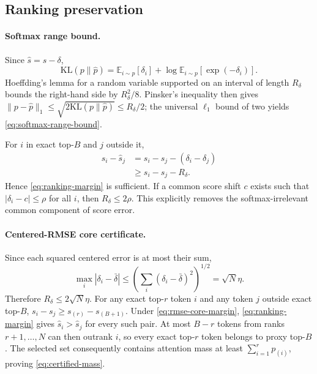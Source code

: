 \subsection{Ranking preservation}

\paragraph{Softmax range bound.}
Since $\widehat s=s-\delta$,
\begin{equation}
 \mathrm{KL}(p\|\widehat p)
 =\mathbb E_{i\sim p}[\delta_i]
  +\log\mathbb E_{i\sim p}[\exp(-\delta_i)].
\end{equation}
Hoeffding's lemma for a random variable supported on an interval of length
$R_\delta$ bounds the right-hand side by $R_\delta^2/8$.
Pinsker's inequality then gives
$\|p-\widehat p\|_1\le\sqrt{2\mathrm{KL}(p\|\widehat p)}
\le R_\delta/2$; the universal $\ell_1$ bound of two yields
\cref{eq:softmax-range-bound}.

For $i$ in exact top-$B$ and $j$ outside it,
\begin{align}
 \widehat s_i-\widehat s_j
 &=s_i-s_j-(\delta_i-\delta_j)\\
 &\ge s_i-s_j-R_\delta.
\end{align}
Hence \cref{eq:ranking-margin} is sufficient.
If a common score shift $c$ exists such that
$|\delta_i-c|\le\rho$ for all $i$, then $R_\delta\le2\rho$.
This explicitly removes the softmax-irrelevant common component of score
error.

\paragraph{Centered-RMSE core certificate.}
Since each squared centered error is at most their sum,
\begin{equation}
 \max_i|\delta_i-\bar\delta|
 \le\left(\sum_i(\delta_i-\bar\delta)^2\right)^{1/2}
 =\sqrt{N}\eta.
\end{equation}
Therefore $R_\delta\le2\sqrt{N}\eta$.
For any exact top-$r$ token $i$ and any token $j$ outside exact top-$B$,
$s_i-s_j\ge s_{(r)}-s_{(B+1)}$.
Under \cref{eq:rmse-core-margin}, \cref{eq:ranking-margin} gives
$\widehat s_i>\widehat s_j$ for every such pair.
At most $B-r$ tokens from ranks $r+1,\ldots,N$ can then outrank $i$, so every
exact top-$r$ token belongs to proxy top-$B$.
The selected set consequently contains attention mass at least
$\sum_{i=1}^{r}p_{(i)}$, proving \cref{eq:certified-mass}.

